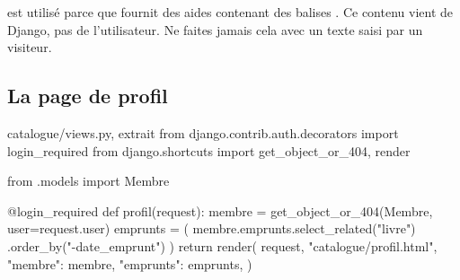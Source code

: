 
\begin{note}
 est utilisé parce que  fournit des
aides contenant des balises . Ce contenu vient de Django, pas de
l'utilisateur. Ne faites jamais cela avec un texte saisi par un visiteur.
\end{note}

\subsection{La page de profil}

\begin{codebox}[python]{catalogue/views.py, extrait}
from django.contrib.auth.decorators import login_required
from django.shortcuts import get_object_or_404, render

from .models import Membre


@login_required
def profil(request):
    membre = get_object_or_404(Membre, user=request.user)
    emprunts = (
        membre.emprunts.select_related("livre")
        .order_by("-date_emprunt")
    )
    return render(
        request,
        "catalogue/profil.html",
        {"membre": membre, "emprunts": emprunts},
    )
\end{codebox}

